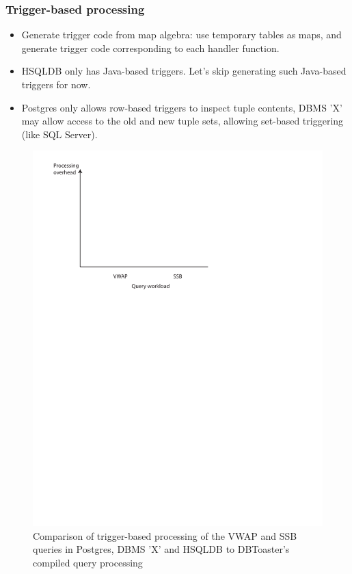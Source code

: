 \documentclass{sig-alternate}
\begin{document}
\subsubsection{Trigger-based processing}
\begin{itemize}
\item Generate trigger code from map algebra: use temporary tables as maps, and
  generate trigger code corresponding to each handler function.
\item HSQLDB only has Java-based triggers. Let's skip generating such Java-based
  triggers for now.
\item Postgres only allows row-based triggers to inspect tuple contents, DBMS
  'X' may allow access to the old and new tuple sets, allowing set-based
  triggering (like SQL Server).
\end{itemize}

\begin{figure}
\includegraphics[scale=0.6]{figures/axes-triggers.pdf}
\caption{Comparison of trigger-based processing of the VWAP and SSB queries in
Postgres, DBMS 'X' and HSQLDB to DBToaster's compiled query processing}
\label{fig:overhead-trigger}
\end{figure}
\end{document}
